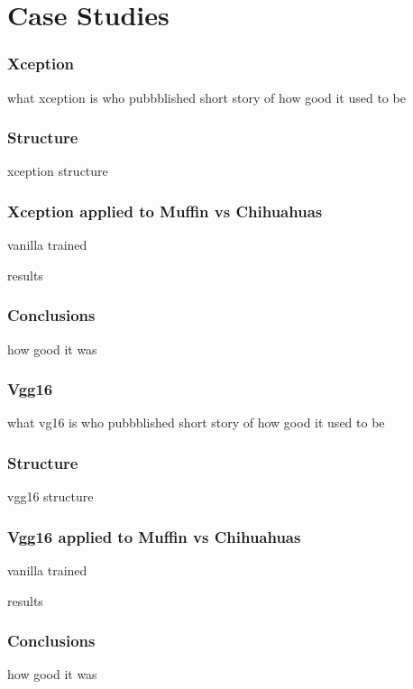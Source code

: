 \section{Case Studies}

\subsubsection{Xception}

what xception is
who pubbblished
short story of how good it used to be

\subsubsection{Structure}
xception structure

\subsubsection{Xception applied to Muffin vs Chihuahuas}

vanilla
trained

results

\subsubsection{Conclusions}
how good it was

\subsubsection{Vgg16}

what vg16 is
who pubbblished
short story of how good it used to be

\subsubsection{Structure}
vgg16 structure

\subsubsection{Vgg16 applied to Muffin vs Chihuahuas}

vanilla
trained

results

\subsubsection{Conclusions}
how good it was

